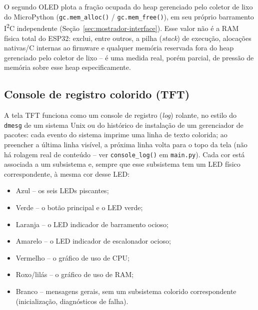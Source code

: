 \documentclass[12pt,a4paper]{article}
\begin{document}
O segundo OLED plota a fração ocupada do heap gerenciado pelo coletor de lixo do MicroPython (\texttt{gc.mem\_alloc()} / \texttt{gc.mem\_free()}), em seu próprio barramento I\textsuperscript{2}C independente (Seção~\ref{sec:mostrador-interface}). Esse valor não é a RAM física total do ESP32: exclui, entre outros, a pilha (\textit{stack}) de execução, alocações nativas/C internas ao firmware e qualquer memória reservada fora do heap gerenciado pelo coletor de lixo -- é uma medida real, porém parcial, de pressão de memória sobre esse heap especificamente.

\subsection{Console de registro colorido (TFT)}
\label{sec:tft-console}

A tela TFT funciona como um console de registro (\textit{log}) rolante, no estilo do \texttt{dmesg} de um sistema Unix ou do histórico de instalação de um gerenciador de pacotes: cada evento do sistema imprime uma linha de texto colorida; ao preencher a última linha visível, a próxima linha volta para o topo da tela (não há rolagem real de conteúdo -- ver \texttt{console\_log()} em \texttt{main.py}). Cada cor está associada a um subsistema e, sempre que esse subsistema tem um LED físico correspondente, à mesma cor desse LED:

\begin{itemize}
  \item Azul -- os seis LEDs piscantes;
  \item Verde -- o botão principal e o LED verde;
  \item Laranja -- o LED indicador de barramento ocioso;
  \item Amarelo -- o LED indicador de escalonador ocioso;
  \item Vermelho -- o gráfico de uso de CPU;
  \item Roxo/lilás -- o gráfico de uso de RAM;
  \item Branco -- mensagens gerais, sem um subsistema colorido correspondente (inicialização, diagnósticos de falha).
\end{itemize}
\end{document}
